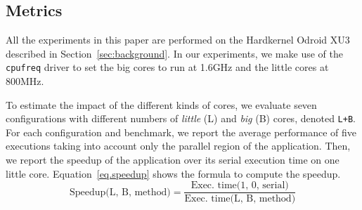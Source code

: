 




\subsection{Metrics}
\label{sec:metrics}

All the experiments in this paper are performed on the Hardkernel Odroid XU3 described in Section~\ref{sec:background}. In our experiments, we make use of the \texttt{cpufreq} driver to set the big cores to run at 1.6GHz and the little cores at 800MHz. 


To estimate the impact of the different kinds of cores, we evaluate seven configurations with different numbers of \textit{little} (L) and \textit{big} (B) cores, denoted \texttt{L+B}.
For each configuration and benchmark, we report the average performance of five executions taking into account only the parallel region of the application. Then, we report the speedup of the application over its serial execution time on one little core.
Equation~\ref{eq.speedup} shows the formula to compute the speedup.
\begingroup\makeatletter\def\f@size{9}\check@mathfonts
\begin{equation}
  \text{Speedup(L, B, method)} = \frac{\text{Exec. time(1, 0, serial)}}{\text{Exec. time(L, B, method)}}
\label{eq.speedup}
\end{equation}
\endgroup


